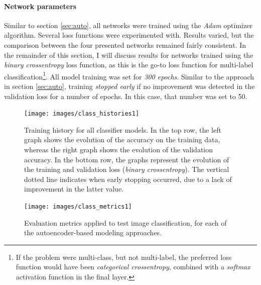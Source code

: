 \paragraph{Network parameters}
Similar to section \textcolor{blue}{\ref{sec:auto}}, all networks were trained using the \textit{Adam} optimizer algorithm. Several loss functions were experimented with. Results varied, but the comparison between the four presented networks remained fairly consistent. In the remainder of this section, I will discuss results for networks trained using the \textit{binary crossentropy} loss function, as this is the go-to loss function for multi-label classification\footnote{If the problem were multi-class, but not multi-label, the preferred loss function would have been \textit{categorical crossentropy}, combined with a \textit{softmax} activation function in the final layer.}. All model training was set for \textit{300 epochs}. Similar to the approach in section \textcolor{blue}{\ref{sec:auto}}, training \textit{stopped early} if no improvement was detected in the validation loss for a number of epochs. In this case, that number was set to 50. 

\begin{figure}[!htbp]
	\begin{center}
		\texttt{[image: images/class\_histories1]}
		\caption{Training history for all classifier models. In the top row, the left graph shows the evolution of the accuracy on the training data, whereas the right graph shows the evolution of the validation accuracy. In the bottom row, the graphs represent the evolution of the training and validation loss (\textit{binary crossentropy}). The vertical dotted line indicates when early stopping occurred, due to a lack of improvement in the latter value.}
		\label{fig:class_histories1}
	\end{center}
\end{figure}

\begin{figure}[!htbp]
	\begin{center}
		\texttt{[image: images/class\_metrics1]}
		\caption{Evaluation metrics applied to test image classification, for each of the autoencoder-based modeling approaches.}
		\label{fig:class_metrics1}
	\end{center}
\end{figure}

